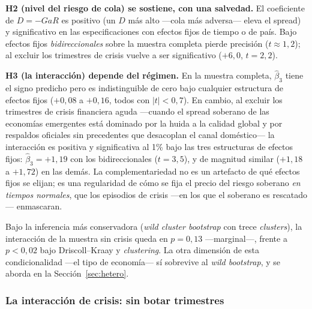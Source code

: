 \textbf{H2 (nivel del riesgo de cola) se sostiene, con una salvedad.} El coeficiente de $D=-GaR$ es positivo (un $D$ más alto —cola más adversa— eleva el spread) y significativo en las especificaciones con efectos fijos de tiempo o de país. Bajo efectos fijos \emph{bidireccionales} sobre la muestra completa pierde precisión ($t\approx1{,}2$); al excluir los trimestres de crisis vuelve a ser significativo ($+6{,}0$, $t=2{,}2$).

\textbf{H3 (la interacción) depende del régimen.} En la muestra completa, $\hat\beta_3$ tiene el signo predicho pero es indistinguible de cero bajo cualquier estructura de efectos fijos ($+0{,}08$ a $+0{,}16$, todos con $|t|<0{,}7$). En cambio, al excluir los trimestres de crisis financiera aguda —cuando el spread soberano de las economías emergentes está dominado por la huida a la calidad global y por respaldos oficiales sin precedentes que desacoplan el canal doméstico— la interacción es positiva y significativa al 1\% bajo las tres estructuras de efectos fijos: $\hat\beta_3=+1{,}19$ con los bidireccionales ($t=3{,}5$), y de magnitud similar ($+1{,}18$ a $+1{,}72$) en las demás. La complementariedad no es un artefacto de qué efectos fijos se elijan; es una regularidad de cómo se fija el precio del riesgo soberano \emph{en tiempos normales}, que los episodios de crisis —en los que el soberano es rescatado— enmascaran.

Bajo la inferencia más conservadora (\textit{wild cluster bootstrap} con trece \textit{clusters}), la interacción de la muestra sin crisis queda en $p=0{,}13$ —marginal—, frente a $p<0{,}02$ bajo Driscoll--Kraay y \textit{clustering}. La otra dimensión de esta condicionalidad —el tipo de economía— sí sobrevive al \textit{wild bootstrap}, y se aborda en la Sección~\ref{sec:hetero}.

\subsubsection{La interacción de crisis: sin botar trimestres}
\label{sec:crisis-interaccion}

